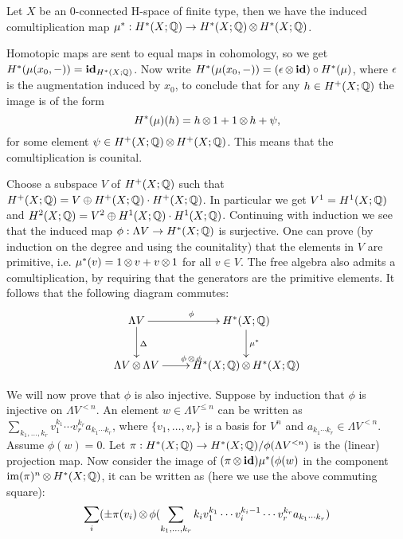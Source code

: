 
Let $X$ be an $0$-connected H-space of finite type, then we have the induced comultiplication map $\mu^\ast: H^\ast(X; \mathbb{Q}) \to H^\ast(X; \mathbb{Q}) \operatorname*{\otimes} H^\ast(X; \mathbb{Q})$.

Homotopic maps are sent to equal maps in cohomology, so we get $H^\ast(\mu(x_0, -)) = \mathbf{id}_{H^\ast(X; \mathbb{Q})}$. Now write $H^\ast(\mu(x_0, -)) = (\epsilon \operatorname*{\otimes} \mathbf{id}) \circ H^\ast(\mu)$, where $\epsilon$ is the augmentation induced by $x_0$, to conclude that for any $h \in H^{+}(X; \mathbb{Q})$ the image is of the form
$$ H^\ast(\mu)(h) = h \operatorname*{\otimes} 1 + 1 \operatorname*{\otimes} h + \psi, $$
for some element $\psi \in H^{+}(X; \mathbb{Q}) \operatorname*{\otimes} H^{+}(X; \mathbb{Q})$. This means that the comultiplication is counital.

Choose a subspace $V$ of $H^+(X; \mathbb{Q})$ such that $H^+(X; \mathbb{Q}) = V \oplus H^+(X; \mathbb{Q}) \cdot H^+(X; \mathbb{Q})$. In particular we get $V^1 = H^1(X; \mathbb{Q})$ and $H^2(X; \mathbb{Q}) = V^2 \oplus H^1(X; \mathbb{Q}) \cdot H^1(X; \mathbb{Q})$. Continuing with induction we see that the induced map $\phi : \Lambda V \to H^\ast(X; \mathbb{Q})$ is surjective. One can prove (by induction on the degree and using the counitality) that the elements in $V$ are primitive, i.e. $\mu^\ast(v) = 1 \operatorname*{\otimes} v + v \operatorname*{\otimes} 1$ for all $v \in V$. The free algebra also admits a comultiplication, by requiring that the generators are the primitive elements. It follows that the following diagram commutes:
\[ \xymatrix{
	\Lambda V \ar[r]^\phi \ar[d]^\Delta & H^\ast(X; \Q) \ar[d]^{\mu^\ast} \\
	\Lambda V \tensor \Lambda V \ar[r]^{\phi\tensor\phi} & H^\ast(X; \Q) \tensor H^\ast(X; \Q) \\
} \]

We will now prove that $\phi$ is also injective. Suppose by induction that $\phi$ is injective on $\Lambda V^{<n}$. An element $w \in \Lambda V^{\leq n}$ can be written as $\sum_{k_1, \ldots, k_r} v_1^{k_1} \cdots v_r^{k_r} a_{k_1 \cdots k_r}$, where $\{v_1, \ldots, v_r\}$ is a basis for $V^n$ and $a_{k_1 \cdots k_r} \in \Lambda V^{<n}$. Assume $\phi(w) = 0$. Let $\pi : H^\ast(X; \mathbb{Q}) \to H^\ast(X; \mathbb{Q}) / \phi(\Lambda V^{<n})$ is the (linear) projection map. Now consider the image of $(\pi \operatorname*{\otimes} \mathbf{id}) \mu^\ast (\phi(w)$ in the component $\operatorname*{im}(\pi)^n \operatorname*{\otimes} H^\ast(X; \mathbb{Q})$, it can be written as (here we use the above commuting square):
\[ \sum_i ( \pm \pi(v_i) \operatorname*{\otimes} \phi(\sum_{k_1, \ldots, k_r} k_i v_1^{k_1} \cdots v_i^{k_i - 1} \cdots v_r^{k_r}a_{k_1 \cdots k_r}) \]

